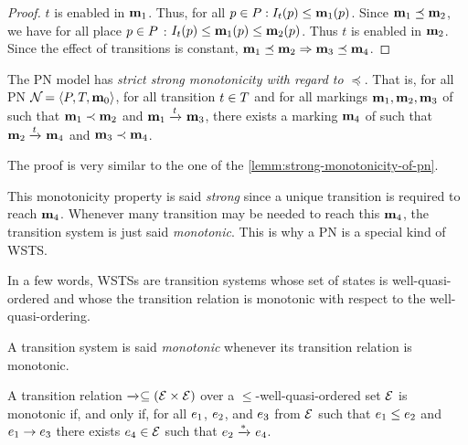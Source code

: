 \begin{proof}
  $t$ is enabled in $\mathbf{m}_1$.
	Thus, for all $p \in \places : \inw[t][p] \leq \mar_1(p)$.
	Since $\mathbf{m}_1 \preceq \mathbf{m}_2$, we have for all place $p \in P$ : $\inw[t][p] \leq \mar_1(p) \leq \mar_2(p)$.
	Thus $t$ is enabled in $\mathbf{m}_2$.
	Since the effect of transitions is constant, $\mathbf{m}_1 \preceq \mathbf{m}_2 \Rightarrow \mathbf{m}_3 \preceq \mathbf{m}_4$.
\end{proof}

\begin{lemm}
  The \ac{PN} model has \emph{strict strong monotonicity with regard to $\preceq$}.
	That is, for all \ac{PN} $\defPN$, for all transition $t \in T$ and for all markings $\mathbf{m}_1, \mathbf{m}_2, \mathbf{m}_3$ of \namePN such that $\mathbf{m}_1 \prec \mathbf{m}_2$ and $\mathbf{m}_1 \xrightarrow{t}_{} \mathbf{m}_3$, there exists a marking $\mathbf{m}_4$ of \namePN such that $\mathbf{m}_2 \xrightarrow{t}_{} \mathbf{m}_4$ and $\mathbf{m}_3 \prec \mathbf{m}_4$.
\end{lemm}

The proof is very similar to the one of the \cref{lemm:strong-monotonicity-of-pn}.

This monotonicity property is said \emph{strong} since a unique transition is required to reach $\mathbf{m}_4$.
Whenever many transition may be needed to reach this $\mathbf{m}_4$, the transition system is just said \emph{monotonic}.
This is why a \ac{PN} is a special kind of \ac{WSTS}.

In a few words, \acp{WSTS} are transition systems whose set of states is well-quasi-ordered and whose the transition relation is monotonic with respect to the well-quasi-ordering.

\begin{defi}[Monotonicity]
  \label{defi:monotonicity}
  A transition system is said \emph{monotonic} whenever its transition relation is monotonic.

  A transition relation $\xrightarrow{}_{} \subseteq (\mathcal{E} \times \mathcal{E})$ over a $\leq$-well-quasi-ordered set $\mathcal{E}$ is monotonic if, and only if, for all $e_1$, $e_2$, and $e_3$ from $\mathcal{E}$ such that $e_1 \leq e_2$ and $e_1 \rightarrow e_3$ there exists $e_4 \in \mathcal{E}$ such that $e_2 \xrightarrow{*}_{} e_4$.
\end{defi}

